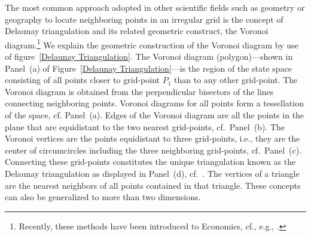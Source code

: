 \documentclass[a4paper,12pt]{article}
\begin{document}
The most common approach adopted in other scientific fields such as geometry or geography to locate neighboring points in an irregular grid is the concept of Delaunay triangulation and its related geometric construct, the Voronoi diagram.\footnote{Recently, these methods have been introduced to Economics, cf., e.g., .}
We explain the geometric construction of the Voronoi diagram by use of figure~\ref{Delaunay Triangulation}. The Voronoi diagram (polygon)---shown in Panel~(a) of Figure~\ref{Delaunay Triangulation}---is the region of the state space consisting of all points closer to grid-point $P_{1}$ than to any other grid-point. The Voronoi diagram is obtained from the perpendicular bisectors of the lines connecting neighboring points. Voronoi diagrams for all points form a tessellation of the space, cf. Panel~(a). Edges of the Voronoi diagram are all the points in the plane that are equidistant to the two nearest grid-points, cf.~Panel~(b). The Voronoi vertices are the points equidistant to three grid-points, i.e., they are the center of circumcircles including the three neighboring grid-points, cf.~Panel~(c). Connecting these grid-points constitutes the unique triangulation known as the Delaunay triangulation as displayed in Panel~(d), cf.~. The vertices of a triangle are the nearest neighbors of all points contained in that triangle. These concepts can also be generalized to more than two dimensions.
\end{document}
